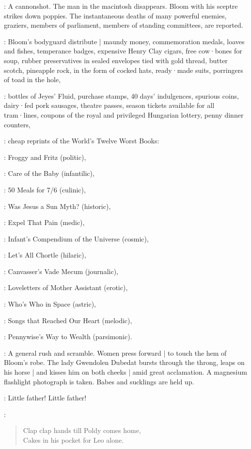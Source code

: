 :
A cannonshot.
The man in the macintosh disappears.
Bloom with his sceptre strikes down poppies.
The instantaneous deaths of many powerful enemies,
graziers,
members of parliament,
members of standing committees,
are reported.

:
Bloom's bodyguard distribute |
maundy money,
commemoration medals,
loaves and fishes,
temperance badges,
expensive Henry Clay cigars,
free cow·bones for soup,
rubber preservatives in sealed envelopes tied with gold thread,
butter scotch,
pineapple rock,
in the form of cocked hats,
ready·made suits,
porringers of toad in the hole,

:
bottles of Jeyes' Fluid,
purchase stamps,
40 days' indulgences,
spurious coins,
dairy·fed pork sausages,
theatre passes,
season tickets available for all tram·lines,
coupons of the royal and privileged Hungarian lottery,
penny dinner counters,

:
cheap reprints of the World's Twelve Worst Books:

:
Froggy and Fritz (politic),

:
Care of the Baby (infantilic),

:
50 Meals for 7/6 (culinic),

:
Was Jesus a Sun Myth? (historic),

:
Expel That Pain (medic),

:
Infant's Compendium of the Universe (cosmic),

:
Let's All Chortle (hilaric),

:
Canvasser's Vade Mecum (journalic),

:
Loveletters of Mother Assistant (erotic),

:
Who's Who in Space (astric),

:
Songs that Reached Our Heart (melodic),

:
Pennywise's Way to Wealth (parsimonic).

:
A general rush and scramble.
Women press forward |
to touch the hem of Bloom's robe.
The lady Gwendolen Dubedat bursts through the throng,
leaps on his horse |
and kisses him on both cheeks |
amid great acclamation.
A magnesium flashlight photograph is taken.
Babes and sucklings are held up.

\Women[2]:
Little father!
Little father!

\Sucklings[1]:
\begin{verse}
    Clap clap hands till Poldy comes home,\\
    Cakes in his pocket for Leo alone.
\end{verse}

